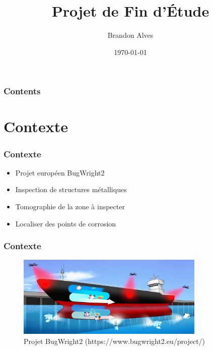 \documentclass{beamer}
\title[Projet de Fin d'Étude]{Projet de Fin d'Étude}
\author{Brandon Alves}
\institute[INSA Lyon]{
	\huge{Réunion de mi-parcours}
}
\date{\today}
\begin{document}
	\begin{frame}
		\titlepage
	\end{frame}
	\begin{frame}
		\frametitle{Contents}
		\tableofcontents
	\end{frame}
	\section{Contexte}
		\begin{frame}
			\frametitle{Contexte}
			\begin{itemize}
				\item Projet européen BugWright2
				\item Inspection de structures métalliques
				\item Tomographie de la zone à inspecter
				\item Localiser des points de corrosion
			\end{itemize}
		\end{frame}
		\begin{frame}
			\frametitle{Contexte}
			\begin{figure}
				\centering
				\includegraphics[width=0.8\textwidth]{graphics/Concept-Cartoon-NJ3-e1582812224528.jpg}
				\caption{Projet BugWright2 (https://www.bugwright2.eu/project/)}
			\end{figure}
		\end{frame}
\end{document}
